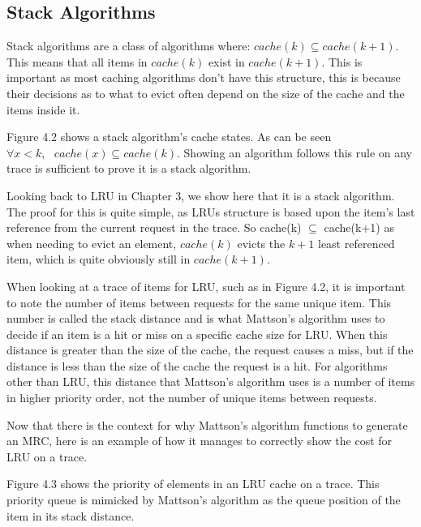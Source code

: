 \subsection{Stack Algorithms}

Stack algorithms are a class of algorithms where: $cache(k) \subseteq cache(k+1)$. This means that all items in $cache(k)$ exist in $cache(k+1)$. This is important as most caching algorithms don't have this structure, this is because their decisions as to what to evict often depend on the size of the cache and the items inside it.


%

Figure 4.2 shows a stack algorithm's cache states. As can be seen $\forall x < k, \text{ } cache(x) \subseteq cache(k)$. Showing an algorithm follows this rule on any trace is sufficient to prove it is a stack algorithm.  

Looking back to LRU in Chapter 3, we show here that it is a stack algorithm. The proof for this is quite simple, as LRUs structure is based upon the item's last reference from the current request in the trace. So cache(k) $\subseteq$ cache(k+1) as
%
when needing to evict an element, $cache(k)$ evicts the $k+1$ least referenced item, which is quite obviously still in $cache(k+1)$.


When looking at a trace of items for LRU, such as in Figure 4.2, it is important to note the number of items between requests for the same unique item. This number is called the stack distance and is what Mattson's algorithm uses to decide if an item is a hit or miss on a specific cache size for LRU. When this distance is greater than the size of the cache, the request causes a miss, but if the distance is less than the size of the cache the request is a hit. For algorithms other than LRU, this distance that Mattson's algorithm uses is a number of items in higher priority order, not the number of unique items between requests.

Now that there is the context for why Mattson's algorithm functions to generate an MRC, here is an example of how it manages to correctly show the cost for LRU on a trace.

Figure 4.3 shows the priority of elements in an LRU cache on a trace. This priority queue is mimicked by Mattson's algorithm as the queue position of the item in its stack distance.


